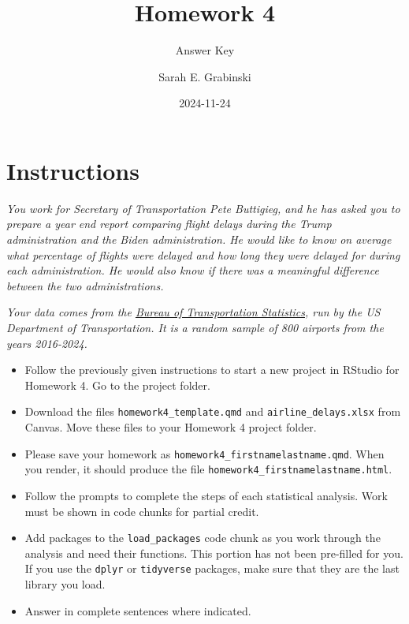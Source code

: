 \documentclass[
  letterpaper,
  DIV=11,
  numbers=noendperiod]{scrartcl}
\title{Homework 4}
\subtitle{Answer Key}
\author{Sarah E. Grabinski}
\date{2024-11-24}
\renewcommand*\contentsname{Table of contents}
\newcommand\contentsname{Table of contents}
\begin{document}
\maketitle

\renewcommand*\contentsname{Table of contents}
{
\hypersetup{linkcolor=}
\setcounter{tocdepth}{3}
\tableofcontents
}

\section*{Instructions}\label{instructions}

\emph{You work for Secretary of Transportation Pete Buttigieg, and he
has asked you to prepare a year end report comparing flight delays
during the Trump administration and the Biden administration. He would
like to know on average what percentage of flights were delayed and how
long they were delayed for during each administration. He would also
know if there was a meaningful difference between the two
administrations.}

\emph{Your data comes from the
\href{https://www.transtats.bts.gov/OT_Delay/OT_DelayCause1.asp?20=E}{Bureau
of Transportation Statistics}, run by the US Department of
Transportation. It is a random sample of 800 airports from the years
2016-2024.}

\begin{itemize}
\item
  Follow the previously given instructions to start a new project in
  RStudio for Homework 4. Go to the project folder.
\item
  Download the files \texttt{homework4\_template.qmd} and
  \texttt{airline\_delays.xlsx} from Canvas. Move these files to your
  Homework 4 project folder.
\item
  Please save your homework as
  \texttt{homework4\_firstnamelastname.qmd}. When you render, it should
  produce the file \texttt{homework4\_firstnamelastname.html}.
\item
  Follow the prompts to complete the steps of each statistical analysis.
  Work must be shown in code chunks for partial credit.
\item
  Add packages to the \texttt{load\_packages} code chunk as you work
  through the analysis and need their functions. This portion has not
  been pre-filled for you. If you use the \texttt{dplyr} or
  \texttt{tidyverse} packages, make sure that they are the last library
  you load.
\item
  Answer in complete sentences where indicated.
\end{itemize}
\end{document}
